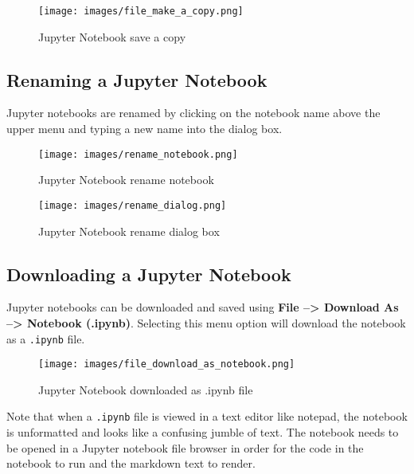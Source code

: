 \documentclass{book}
\makeatletter
\def\maxwidth{\ifdim\Gin@nat@width>\linewidth\linewidth
\else\Gin@nat@width\fi}
\let\Oldincludegraphics\includegraphics
\renewcommand{\includegraphics}[1]{\Oldincludegraphics[width=.8\maxwidth]{#1}}
\newcommand{\passthrough}[1]{#1}
\makeatother
\begin{document}
\begin{figure}
\centering
\texttt{[image: images/file\_make\_a\_copy.png]}
\caption{Jupyter Notebook save a copy}
\end{figure}
    




    
        \hypertarget{renaming-a-jupyter-notebook}{%
\subsection{Renaming a Jupyter
Notebook}\label{renaming-a-jupyter-notebook}}

Jupyter notebooks are renamed by clicking on the notebook name above the
upper menu and typing a new name into the dialog box.

\begin{figure}
\centering
\texttt{[image: images/rename\_notebook.png]}
\caption{Jupyter Notebook rename notebook}
\end{figure}

\begin{figure}
\centering
\texttt{[image: images/rename\_dialog.png]}
\caption{Jupyter Notebook rename dialog box}
\end{figure}
    




    
        \hypertarget{downloading-a-jupyter-notebook}{%
\subsection{Downloading a Jupyter
Notebook}\label{downloading-a-jupyter-notebook}}

Jupyter notebooks can be downloaded and saved using \textbf{File
--\textgreater{} Download As --\textgreater{} Notebook (.ipynb)}.
Selecting this menu option will download the notebook as a
\passthrough{\lstinline!.ipynb!} file.

\begin{figure}
\centering
\texttt{[image: images/file\_download\_as\_notebook.png]}
\caption{Jupyter Notebook downloaded as .ipynb file}
\end{figure}

Note that when a \passthrough{\lstinline!.ipynb!} file is viewed in a
text editor like notepad, the notebook is unformatted and looks like a
confusing jumble of text. The notebook needs to be opened in a Jupyter
notebook file browser in order for the code in the notebook to run and
the markdown text to render.
\end{document}
